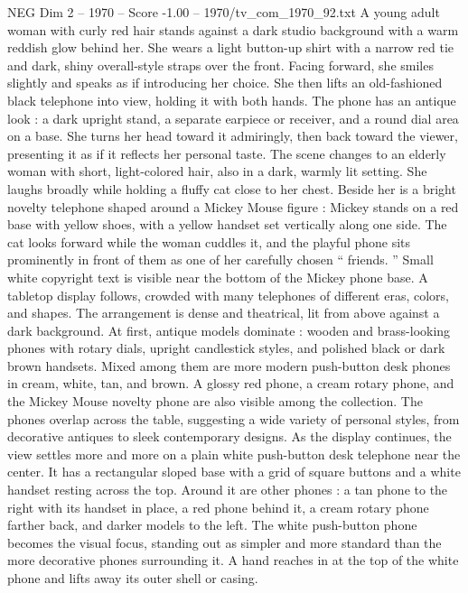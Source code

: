 \begin{textsample}{NEG Dim 2 – 1970 – Score -1.00 – 1970/tv\_com\_1970\_92.txt}  \label{ex:f2_neg_023}
A young adult woman with curly red hair stands against a dark studio background with a warm reddish glow behind her.
She wears a light button-up shirt with a narrow red tie and dark, shiny overall-style straps over the front.
Facing forward, she smiles slightly and speaks as if introducing her choice.
She then lifts an old-fashioned black telephone into view, holding it with both hands.
The phone has an antique look : a dark upright stand, a separate earpiece or receiver, and a round dial area on a base.
She turns her head toward it admiringly, then back toward the viewer, presenting it as if it reflects her personal taste.
The scene changes to an elderly woman with short, light-colored hair, also in a dark, warmly lit setting.
She laughs broadly while holding a fluffy cat close to her chest.
Beside her is a bright novelty telephone shaped around a Mickey Mouse figure : Mickey stands on a red base with yellow shoes, with a yellow handset set vertically along one side.
The cat looks forward while the woman cuddles it, and the playful phone sits prominently in front of them as one of her carefully chosen “ friends. ” Small white copyright text is visible near the bottom of the Mickey phone base.
A tabletop display follows, crowded with many telephones of different eras, colors, and shapes.
The arrangement is dense and theatrical, lit from above against a dark background.
At first, antique models dominate : wooden and brass-looking phones with rotary dials, upright candlestick styles, and polished black or dark brown handsets.
Mixed among them are more modern push-button desk phones in cream, white, tan, and brown.
A glossy red phone, a cream rotary phone, and the Mickey Mouse novelty phone are also visible among the collection.
The phones overlap across the table, suggesting a wide variety of personal styles, from decorative antiques to sleek contemporary designs.
As the display continues, the view settles more and more on a plain white push-button desk telephone near the center.
It has a rectangular sloped base with a grid of square buttons and a white handset resting across the top.
Around it are other phones : a tan phone to the right with its handset in place, a red phone behind it, a cream rotary phone farther back, and darker models to the left.
The white push-button phone becomes the visual focus, standing out as simpler and more standard than the more decorative phones surrounding it.
A hand reaches in at the top of the white phone and lifts away its outer shell or casing.

\end{textsample}
